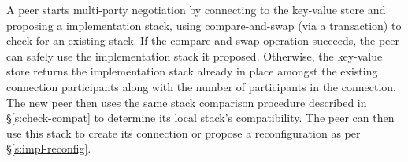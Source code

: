 A peer starts multi-party negotiation by connecting to the key-value store and proposing a \tunnel implementation stack, using compare-and-swap (\eg via a transaction) to check for an existing stack.
If the compare-and-swap operation succeeds, the peer can safely use the \tunnel implementation stack it proposed. 
Otherwise, the key-value store returns the \tunnel implementation stack already in place amongst the existing connection participants along with the number of participants in the connection.
The new peer then uses the same stack comparison procedure described in \S\ref{s:check-compat} to determine its local stack's compatibility.
The peer can then use this stack to create its connection or propose a reconfiguration as per \S\ref{s:impl-reconfig}.
